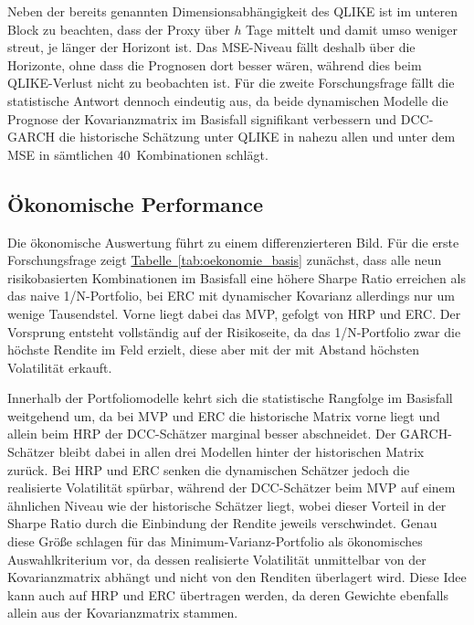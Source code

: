\documentclass[12pt,a4paper]{article}
\begin{document}


Neben der bereits genannten Dimensionsabhängigkeit des QLIKE ist im unteren Block zu beachten, dass der Proxy über $h$ Tage mittelt und damit umso weniger streut, je länger der Horizont ist.
Das MSE-Niveau fällt deshalb über die Horizonte, ohne dass die Prognosen dort besser wären, während dies beim QLIKE-Verlust nicht zu beobachten ist.
Für die zweite Forschungsfrage fällt die statistische Antwort dennoch eindeutig aus, da beide dynamischen Modelle die Prognose der Kovarianzmatrix im Basisfall signifikant verbessern und DCC-GARCH die historische Schätzung unter QLIKE in nahezu allen und unter dem MSE in sämtlichen 40~Kombinationen schlägt.

\subsection{Ökonomische Performance}\label{sec:oekonomisch}
Die ökonomische Auswertung führt zu einem differenzierteren Bild.
Für die erste Forschungsfrage zeigt \hyperref[tab:oekonomie_basis]{Tabelle~\ref*{tab:oekonomie_basis}} zunächst, dass alle neun risikobasierten Kombinationen im Basisfall eine höhere Sharpe Ratio erreichen als das naive 1/N-Portfolio, bei ERC mit dynamischer Kovarianz allerdings nur um wenige Tausendstel.
Vorne liegt dabei das MVP, gefolgt von HRP und ERC.
Der Vorsprung entsteht vollständig auf der Risikoseite, da das 1/N-Portfolio zwar die höchste Rendite im Feld erzielt, diese aber mit der mit Abstand höchsten Volatilität erkauft.



%

Innerhalb der Portfoliomodelle kehrt sich die statistische Rangfolge im Basisfall weitgehend um, da bei MVP und ERC die historische Matrix vorne liegt und allein beim HRP der DCC-Schätzer marginal besser abschneidet.
Der GARCH-Schätzer bleibt dabei in allen drei Modellen hinter der historischen Matrix zurück.
Bei HRP und ERC senken die dynamischen Schätzer jedoch die realisierte Volatilität spürbar, während der DCC-Schätzer beim MVP auf einem ähnlichen Niveau wie der historische Schätzer liegt, wobei dieser Vorteil in der Sharpe Ratio durch die Einbindung der Rendite jeweils verschwindet.
Genau diese Größe schlagen \textcite{engle2006} für das Minimum-Varianz-Portfolio als ökonomisches Auswahlkriterium vor, da dessen realisierte Volatilität unmittelbar von der Kovarianzmatrix abhängt und nicht von den Renditen überlagert wird.
Diese Idee kann auch auf HRP und ERC übertragen werden, da deren Gewichte ebenfalls allein aus der Kovarianzmatrix stammen.
\end{document}
